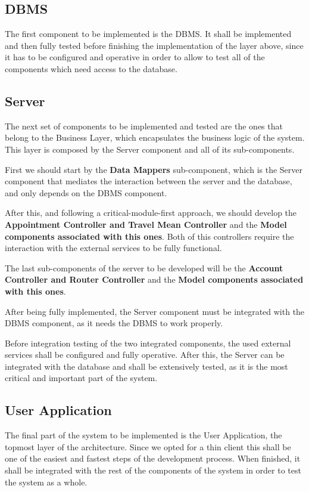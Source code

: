 \documentclass[12pt]{article}
\begin{document}
\subsection{DBMS}
The first component to be implemented is the DBMS. It shall be implemented and then fully tested before finishing the implementation of the layer above, since it has to be configured and operative in order to allow to test all of the components which need access to the database.
    
\subsection{Server}
The next set of components to be implemented and tested are the ones that belong to the Business Layer, which encapsulates the business logic of the system. This layer is composed by the Server component and all of its sub-components. 

First we should start by the \textbf{Data Mappers} sub-component, which is the Server component that mediates the interaction between the server and the database, and only depends on the DBMS component.

After this, and following a critical-module-first approach, we should develop the \textbf{Appointment Controller and Travel Mean Controller} and the \textbf{Model components associated with this ones}. Both of this controllers require the interaction with the external services to be fully functional.

The last sub-components of the server to be developed will be the \textbf{Account Controller and Router Controller} and the \textbf{Model components associated with this ones}.

After being fully implemented, the Server component must be integrated with the DBMS component, as it needs the DBMS to work properly.

Before integration testing of the two integrated components, the used external services shall be configured and fully operative.
After this, the Server can be integrated with the database and shall be extensively tested, as it is the most critical and important part of the system.

\subsection{User Application}
The final part of the system to be implemented is the User Application, the topmost layer of the architecture. Since we opted for a thin client this shall be one of the easiest and fastest steps of the development process.
When finished, it shall be integrated with the rest of the components of the system in order to test the system as a whole.
\end{document}
